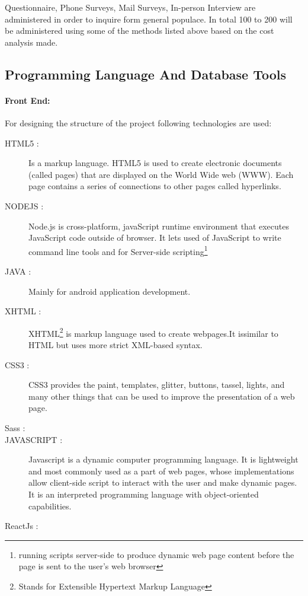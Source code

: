 Questionnaire, Phone Surveys, Mail Surveys, In-person Interview are administered in order to inquire form general populace. In total 100 to 200 will be administered using some of the methods listed above based on the cost analysis made.

\subsection{Programming Language And Database Tools}
\paragraph{Front End:}
For designing the structure of the project following technologies are used:
\begin{description}
\item[HTML5 : ] Is a markup language. HTML5 is used to create electronic documents (called pages) that are displayed on the World Wide web (WWW). Each page contains a series of connections to other pages called hyperlinks.
\item[NODEJS : ] Node.js is cross-platform, javaScript runtime environment that executes JavaScript code outside of browser. It lets used of JavaScript to write command line tools and for Server-side scripting\footnote{running scripts server-side to produce dynamic web page content before the page is sent to the user's web browser}
\item [JAVA : ] Mainly for android application development.
\item [XHTML : ] XHTML\footnote{Stands for Extensible Hypertext Markup Language} is markup language used to create webpages.It issimilar to HTML but uses more strict XML-based syntax.
\item [CSS3 : ] CSS3 provides the paint, templates, glitter, buttons, tassel, lights, and many other things that can be used to improve the presentation of a web page.
\item [Sass :]
\item [JAVASCRIPT : ] Javascript is a dynamic computer programming language. It is lightweight and most commonly used as a part of web pages, whose implementations allow client-side script to interact with the user and make dynamic pages. It is an interpreted programming language with object-oriented capabilities.
\item [ReactJs :]
\end{description}

